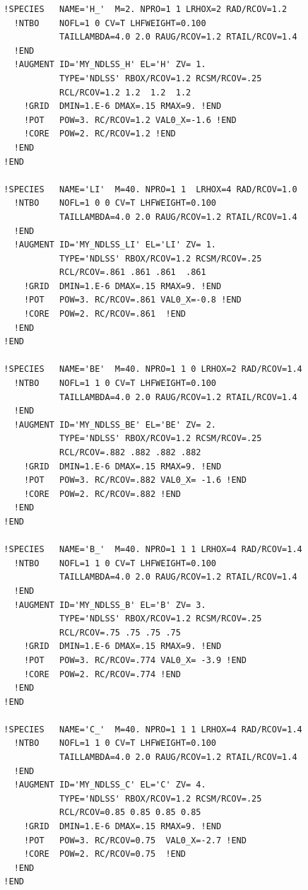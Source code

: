 \documentclass[11pt,a4paper]{report}
\begin{document}
\begin{verbatim}
  !SPECIES   NAME='H_'  M=2. NPRO=1 1 LRHOX=2 RAD/RCOV=1.2
    !NTBO    NOFL=1 0 CV=T LHFWEIGHT=0.100
             TAILLAMBDA=4.0 2.0 RAUG/RCOV=1.2 RTAIL/RCOV=1.4 
    !END 
    !AUGMENT ID='MY_NDLSS_H' EL='H' ZV= 1.
             TYPE='NDLSS' RBOX/RCOV=1.2 RCSM/RCOV=.25
             RCL/RCOV=1.2 1.2  1.2  1.2 
      !GRID  DMIN=1.E-6 DMAX=.15 RMAX=9. !END
      !POT   POW=3. RC/RCOV=1.2 VAL0_X=-1.6 !END
      !CORE  POW=2. RC/RCOV=1.2 !END
    !END
  !END

  !SPECIES   NAME='LI'  M=40. NPRO=1 1  LRHOX=4 RAD/RCOV=1.0
    !NTBO    NOFL=1 0 0 CV=T LHFWEIGHT=0.100
             TAILLAMBDA=4.0 2.0 RAUG/RCOV=1.2 RTAIL/RCOV=1.4 
    !END 
    !AUGMENT ID='MY_NDLSS_LI' EL='LI' ZV= 1.
             TYPE='NDLSS' RBOX/RCOV=1.2 RCSM/RCOV=.25
             RCL/RCOV=.861 .861 .861  .861 
      !GRID  DMIN=1.E-6 DMAX=.15 RMAX=9. !END
      !POT   POW=3. RC/RCOV=.861 VAL0_X=-0.8 !END
      !CORE  POW=2. RC/RCOV=.861  !END
    !END
  !END

  !SPECIES   NAME='BE'  M=40. NPRO=1 1 0 LRHOX=2 RAD/RCOV=1.4
    !NTBO    NOFL=1 1 0 CV=T LHFWEIGHT=0.100
             TAILLAMBDA=4.0 2.0 RAUG/RCOV=1.2 RTAIL/RCOV=1.4 
    !END 
    !AUGMENT ID='MY_NDLSS_BE' EL='BE' ZV= 2.
             TYPE='NDLSS' RBOX/RCOV=1.2 RCSM/RCOV=.25
             RCL/RCOV=.882 .882 .882 .882
      !GRID  DMIN=1.E-6 DMAX=.15 RMAX=9. !END
      !POT   POW=3. RC/RCOV=.882 VAL0_X= -1.6 !END
      !CORE  POW=2. RC/RCOV=.882 !END
    !END
  !END

  !SPECIES   NAME='B_'  M=40. NPRO=1 1 1 LRHOX=4 RAD/RCOV=1.4
    !NTBO    NOFL=1 1 0 CV=T LHFWEIGHT=0.100
             TAILLAMBDA=4.0 2.0 RAUG/RCOV=1.2 RTAIL/RCOV=1.4 
    !END 
    !AUGMENT ID='MY_NDLSS_B' EL='B' ZV= 3.
             TYPE='NDLSS' RBOX/RCOV=1.2 RCSM/RCOV=.25
             RCL/RCOV=.75 .75 .75 .75
      !GRID  DMIN=1.E-6 DMAX=.15 RMAX=9. !END
      !POT   POW=3. RC/RCOV=.774 VAL0_X= -3.9 !END
      !CORE  POW=2. RC/RCOV=.774 !END
    !END
  !END

  !SPECIES   NAME='C_'  M=40. NPRO=1 1 1 LRHOX=4 RAD/RCOV=1.4
    !NTBO    NOFL=1 1 0 CV=T LHFWEIGHT=0.100
             TAILLAMBDA=4.0 2.0 RAUG/RCOV=1.2 RTAIL/RCOV=1.4 
    !END 
    !AUGMENT ID='MY_NDLSS_C' EL='C' ZV= 4.
             TYPE='NDLSS' RBOX/RCOV=1.2 RCSM/RCOV=.25
             RCL/RCOV=0.85 0.85 0.85 0.85 
      !GRID  DMIN=1.E-6 DMAX=.15 RMAX=9. !END
      !POT   POW=3. RC/RCOV=0.75  VAL0_X=-2.7 !END
      !CORE  POW=2. RC/RCOV=0.75  !END
    !END
  !END


\end{verbatim}
\end{document}
